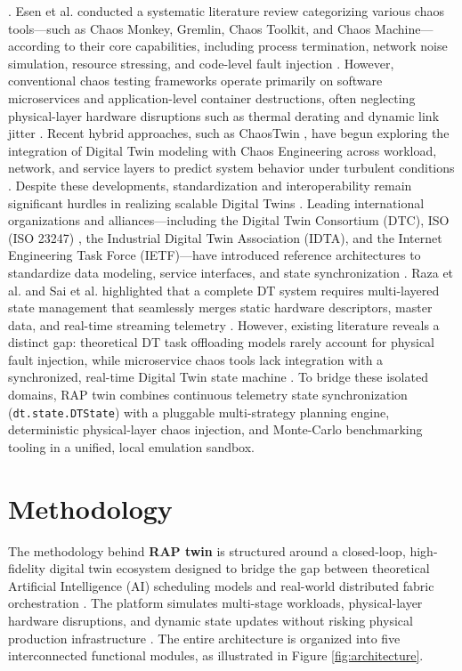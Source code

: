 \documentclass[twoside,twocolumn,10pt]{article}
\begin{document}
. Esen et al. \cite{esen2026} conducted a systematic literature review categorizing various chaos tools—such as Chaos Monkey, Gremlin, Chaos Toolkit, and Chaos Machine—according to their core capabilities, including process termination, network noise simulation, resource stressing, and code-level fault injection
. However, conventional chaos testing frameworks operate primarily on software microservices and application-level container destructions, often neglecting physical-layer hardware disruptions such as thermal derating and dynamic link jitter
. Recent hybrid approaches, such as ChaosTwin \cite{poltronieri2021}, have begun exploring the integration of Digital Twin modeling with Chaos Engineering across workload, network, and service layers to predict system behavior under turbulent conditions
.
Despite these developments, standardization and interoperability remain significant hurdles in realizing scalable Digital Twins
. Leading international organizations and alliances—including the Digital Twin Consortium (DTC), ISO (ISO 23247) \cite{iso23247, dtc2020}, the Industrial Digital Twin Association (IDTA), and the Internet Engineering Task Force (IETF)—have introduced reference architectures to standardize data modeling, service interfaces, and state synchronization
. Raza et al. \cite{raza2025} and Sai et al. \cite{sai2024} highlighted that a complete DT system requires multi-layered state management that seamlessly merges static hardware descriptors, master data, and real-time streaming telemetry
. However, existing literature reveals a distinct gap: theoretical DT task offloading models rarely account for physical fault injection, while microservice chaos tools lack integration with a synchronized, real-time Digital Twin state machine
. To bridge these isolated domains, RAP twin combines continuous telemetry state synchronization (\texttt{dt.state.DTState}) with a pluggable multi-strategy planning engine, deterministic physical-layer chaos injection, and Monte-Carlo benchmarking tooling in a unified, local emulation sandbox.


\section{Methodology}

The methodology behind \textbf{RAP twin} is structured around a closed-loop, high-fidelity digital twin ecosystem designed to bridge the gap between theoretical Artificial Intelligence (AI) scheduling models and real-world distributed fabric orchestration \cite{qi2019, grieves2022}. The platform simulates multi-stage workloads, physical-layer hardware disruptions, and dynamic state updates without risking physical production infrastructure \cite{fuller2020, geyer2021}. The entire architecture is organized into five interconnected functional modules, as illustrated in Figure \ref{fig:architecture}.
\end{document}
